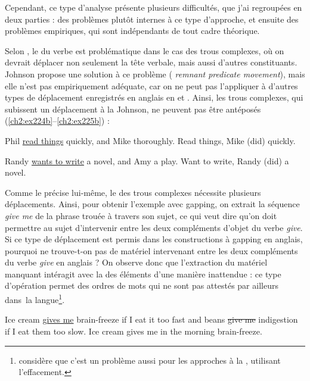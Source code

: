 Cependant, ce type d’analyse présente plusieurs difficultés, que j’ai regroupées en deux parties : des problèmes plutôt internes à ce type d’approche, et ensuite des problèmes empiriques, qui sont indépendants de tout cadre théorique. 

Selon \citet{Vicente2010}, le  du verbe est problématique dans le cas des trous complexes, où on devrait déplacer non seulement la tête verbale, mais aussi d’autres constituants. Johnson propose une solution à ce problème ({{\cad}} \textit{remnant predicate movement}), mais elle n’est pas empiriquement adéquate, car on ne peut pas l’appliquer à d’autres types de déplacement enregistrés en anglais en  et . Ainsi, les trous complexes, qui subissent un déplacement à la Johnson, ne peuvent pas être antéposés (\ref{ch2:ex224b}--\ref{ch2:ex225b}) :

\ea \label{ch2:ex224}
\ea Phil \uline{read things} quickly, and Mike thoroughly.
\ex *Read things, Mike (did) quickly. \citep[510]{Vicente2010} \label{ch2:ex224b} 
\z
\z

\ea \label{ch2:ex225}
\ea Randy \uline{wants to write} a novel, and Amy a play.
\ex  *Want to write, Randy (did) a novel. \citep[510]{Vicente2010} \label{ch2:ex225b}
\z
\z

Comme \citet{Johnson2009} le précise lui-même, le  des trous complexes nécessite plusieurs déplacements. Ainsi, pour obtenir l’exemple  avec gapping, on extrait la séquence \textit{give me} de la phrase trouée à travers son sujet, ce qui veut dire qu’on doit permettre au sujet d’intervenir entre les deux compléments d’objet du verbe \textit{give}. Si ce type de déplacement est permis dans les constructions à gapping en anglais, pourquoi ne trouve-t-on pas de matériel intervenant entre les deux compléments du verbe \textit{give} en anglais  ? On observe donc que l’extraction du matériel manquant intéragit avec la  des éléments d’une manière inattendue : ce type d’opération permet des ordres de mots qui ne sont pas attestés par ailleurs dans~la langue\footnote{
 \citet{Johnson2009} considère que c’est un problème aussi pour les approches à la \citet{Coppock2001}, utilisant l’effacement.}.

\ea \label{ch2:ex226}
\ea Ice cream \uline{gives me} brain-freeze if I eat it too fast and beans \st{give me} indigestion if I eat them too slow. \label{ch2:ex226a}
\ex *Ice cream gives me in the morning brain-freeze. \citep[314]{Johnson2009} \label{ch2:ex226b}
\z
\z

